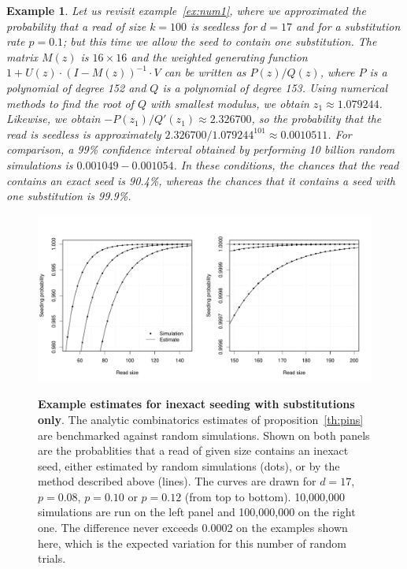 \documentclass{article}
\newtheorem{example}{Example}
\begin{document}
\begin{example}
Let us revisit example~\ref{ex:num1}, where we approximated the
probability that a read of size $k=100$ is seedless for $d=17$ and for a
substitution rate $p=0.1$; but this time we allow the seed to contain one
substitution.  The matrix $M(z)$ is $16\times16$ and the weighted
generating function $1+U(z)\cdot(I-M(z))^{-1}\cdot V$ can be written as
$P(z)/Q(z)$, where $P$ is a polynomial of degree 152 and $Q$ is a
polynomial of degree 153.  Using numerical methods to find the root of $Q$
with smallest modulus, we obtain $z_1 \approx 1.079244$. Likewise,
we obtain $-P(z_1)/Q'(z_1) \approx 2.326700$, so the probability
that the read is seedless is approximately
$2.326700/1.079244^{101} \approx 0.0010511$.
For comparison, a 99\% confidence interval obtained by performing 10
billion random simulations is $0.001049-0.001054$.
In these conditions, the chances that the read contains an exact seed is
90.4\%, whereas the chances that it contains a seed with one substitution
is 99.9\%.
\end{example}


\begin{figure}[h]
\centering
\includegraphics[scale=0.445]{simulp-inexact.pdf}
\label{fig:simulpinexact}
\caption{\textbf{Example estimates for inexact seeding with substitutions
only}. The analytic combinatorics estimates of proposition~\ref{th:pins}
are benchmarked against random simulations.  Shown on both panels are the
probablities that a read of given size contains an inexact seed, either
estimated by random simulations (dots), or by the method described above
(lines). The curves are drawn for $d=17$, $p=0.08$, $p=0.10$ or $p=0.12$
(from top to bottom). 10,000,000 simulations are run on the left panel and
100,000,000 on the right one.  The difference never exceeds 0.0002 on the
examples shown here, which is the expected variation for this number of
random trials.}
\end{figure}
\end{document}
